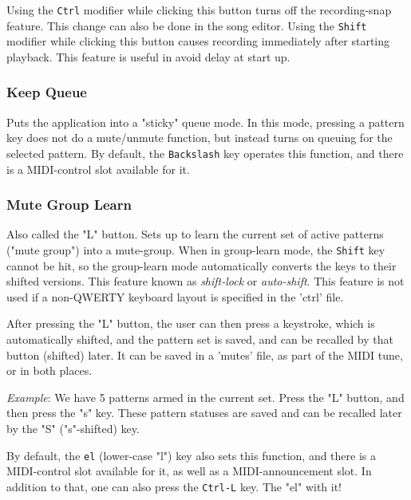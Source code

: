    Using the \texttt{Ctrl} modifier while clicking this button
   turns off the recording-snap feature.
   This change can also be done in the song editor.
   Using the \texttt{Shift} modifier while clicking this button
   causes recording immediately after starting playback.
   This feature is useful in avoid delay at start up.

\subsubsection{Keep Queue}
\label{subsubsec:introduction_keep_queue_button}

   Puts the application into a "sticky" queue mode.
   In this mode, pressing a pattern key does not do a mute/unmute function, but
   instead turns on queuing for the selected pattern.
   By default, the \texttt{Backslash} key operates this function,
   and there is a MIDI-control slot available for it.

\subsubsection{Mute Group Learn}
\label{subsubsec:introduction_mute_group_learn_button}

   Also called the "L" button.
   Sets up to learn the current set of active patterns ("mute group") into a
   mute-group.
   When in group-learn mode, the \texttt{Shift} key cannot be hit, so the
   group-learn mode automatically converts the keys to their shifted versions.
   This feature known as \textsl{shift-lock} or \textsl{auto-shift}.
   This feature is not used if a non-QWERTY keyboard layout is
   specified in the 'ctrl' file.

   After pressing the "L" button, the user can then press a keystroke, which is
   automatically shifted, and the pattern set is saved, and can be recalled by
   that button (shifted) later.  It can be saved in a 'mutes' file, as part of
   the MIDI tune, or in both places.

   \textsl{Example}:
   We have 5 patterns armed in the current set. Press the "L" button,
   and then press the "s" key.  These pattern statuses are saved and can be
   recalled later by the "S" ("s"-shifted) key.

   By default, the \texttt{el} (lower-case "l") key also sets this function,
   and there is a MIDI-control slot available for it, as well as a
   MIDI-announcement slot.
   In addition to that, one can also press
   the \texttt{Ctrl-L} key.
   The "el" with it!


